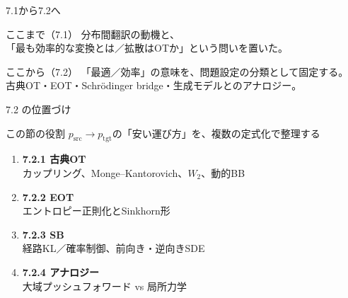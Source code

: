 

\begin{frame}{7.1から7.2へ}
    \begin{block}{ここまで（7.1）}
        分布間翻訳の動機と、\\
        「最も効率的な変換とは／拡散はOTか」という問いを置いた。
    \end{block}
    \begin{block}{ここから（7.2）}
        「最適／効率」の意味を、問題設定の分類として固定する。\\
        古典OT・EOT・Schrödinger bridge・生成モデルとのアナロジー。
    \end{block}
\end{frame}
\asmain
\begin{frame}{7.2 の位置づけ}
    \begin{block}{この節の役割}
        $p_{\mathrm{src}}\to p_{\mathrm{tgt}}$の「安い運び方」を、複数の定式化で整理する
    \end{block}
    \begin{enumerate}
        \item \textbf{7.2.1 古典OT}\\
        カップリング、Monge--Kantorovich、$W_2$、動的BB
        \item \textbf{7.2.2 EOT}\\
        エントロピー正則化とSinkhorn形
        \item \textbf{7.2.3 SB}\\
        経路KL／確率制御、前向き・逆向きSDE
        \item \textbf{7.2.4 アナロジー}\\
        大域プッシュフォワード vs 局所力学
    \end{enumerate}
\end{frame}
